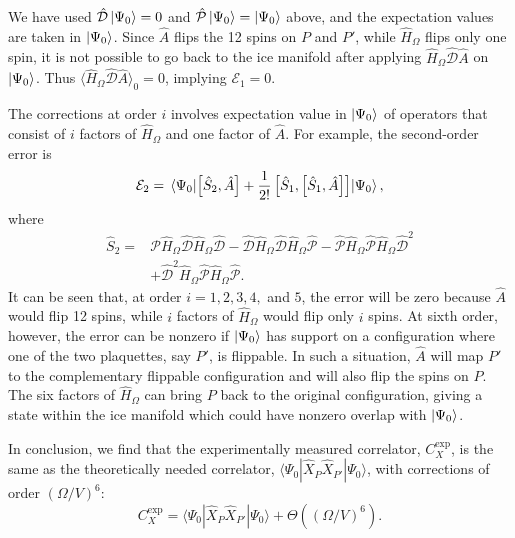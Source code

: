\documentclass[twocolumn,superscriptaddress,amsmath,amssymb,aps,prx,nofootinbib]{revtex4-2}
\begin{document}
We have used $\hat{\mathcal{D}} \ket{\Psi_0}= 0$ and $\hat{\mathcal{P}} \ket{\Psi_0} = \ket{\Psi_0}$ above, and the expectation values are taken in $\ket{\Psi_0}$. 
Since $\hat{A}$ flips the 12 spins on $P$ and $P'$, while $\hat{H}_\Omega$ flips only one spin, it is not possible to go back to the ice manifold after applying $\hat{H}_\Omega \hat{\mathcal{D}} \hat{A}$ on $\ket{\Psi_0}$. Thus $\langle \hat{H}_\Omega \hat{\mathcal{D}} \hat{A} \rangle_0 = 0$, implying $\mathcal{E}_1 =0$.



The corrections at order $i$ involves expectation value in $\ket{\Psi_0}$ of operators that consist of $i$  factors of  $\hat{H}_\Omega$ and one factor of $\hat{A}$. For example, the second-order error is
\begin{equation}
\mathcal{E}_2 = \expval{ \left[ \hat{S}_2 , \hat{A} \right] + \frac{1}{2!} \left[ \hat{S}_1 , \left[ \hat{S}_1 , \hat{A} \right] \right]}{\Psi_0},
\end{equation}
where 
\begin{equation}
\begin{aligned}
\hat{S}_2 = &\mathcal{P} \hat{H}_\Omega \hat{\mathcal{D}} \hat{H}_\Omega \hat{\mathcal{D}}-\hat{\mathcal{D}} \hat{H}_\Omega \hat{\mathcal{D}} \hat{H}_\Omega \hat{\mathcal{P}}-\hat{\mathcal{P}} \hat{H}_\Omega \hat{\mathcal{P}} \hat{H}_\Omega \hat{\mathcal{D}}^2\\
&+\hat{\mathcal{D}}^2 \hat{H}_\Omega \hat{\mathcal{P}} \hat{H}_\Omega \hat{\mathcal{P}}.
\end{aligned}
\end{equation}
It can be seen that, at order $i= 1,2,3,4,$ and $5$, the error will be zero because $\hat{A}$ would flip 12 spins, while $i$ factors of $\hat{H}_\Omega$ would flip only $i$ spins. At sixth order, however, the error can be nonzero if $\ket{\Psi_0}$ has support on a configuration where one of the two plaquettes, say $P'$, is flippable. In such a situation, $\hat{A}$ will map $P' $ to the complementary flippable configuration and will also flip the spins on $P$. The six factors of $\hat{H}_\Omega$ can bring $P$ back to the original configuration, giving a state within the ice manifold which could have nonzero overlap with $\ket{\Psi_0}$. 


In conclusion, we find that the experimentally measured correlator, $C_X^\text{exp}$, is the same as the theoretically needed correlator, $\langle \Psi_0 | \hat{X}_P \hat{X}_{P'}| \Psi_0 \rangle  $, with corrections of order $(\Omega/V)^6$:
\begin{equation}
  C_X^\text{exp} =\langle \Psi_0 | \hat{X}_P \hat{X}_{P'}| \Psi_0 \rangle + \Theta \left( (\Omega/V)^6 \right).
\end{equation}
\end{document}
